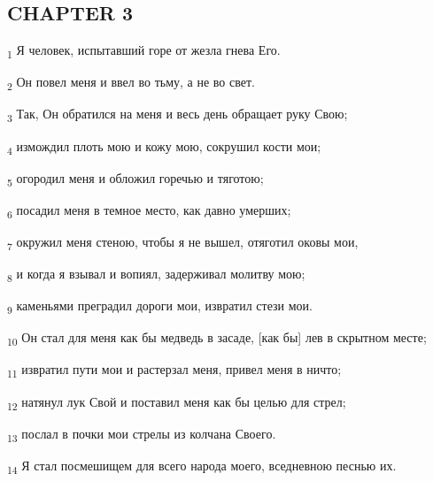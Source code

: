 \subsection{CHAPTER 3}
\begin{tcolorbox}
\textsubscript{1} Я человек, испытавший горе от жезла гнева Его.
\end{tcolorbox}
\begin{tcolorbox}
\textsubscript{2} Он повел меня и ввел во тьму, а не во свет.
\end{tcolorbox}
\begin{tcolorbox}
\textsubscript{3} Так, Он обратился на меня и весь день обращает руку Свою;
\end{tcolorbox}
\begin{tcolorbox}
\textsubscript{4} измождил плоть мою и кожу мою, сокрушил кости мои;
\end{tcolorbox}
\begin{tcolorbox}
\textsubscript{5} огородил меня и обложил горечью и тяготою;
\end{tcolorbox}
\begin{tcolorbox}
\textsubscript{6} посадил меня в темное место, как давно умерших;
\end{tcolorbox}
\begin{tcolorbox}
\textsubscript{7} окружил меня стеною, чтобы я не вышел, отяготил оковы мои,
\end{tcolorbox}
\begin{tcolorbox}
\textsubscript{8} и когда я взывал и вопиял, задерживал молитву мою;
\end{tcolorbox}
\begin{tcolorbox}
\textsubscript{9} каменьями преградил дороги мои, извратил стези мои.
\end{tcolorbox}
\begin{tcolorbox}
\textsubscript{10} Он стал для меня как бы медведь в засаде, [как бы] лев в скрытном месте;
\end{tcolorbox}
\begin{tcolorbox}
\textsubscript{11} извратил пути мои и растерзал меня, привел меня в ничто;
\end{tcolorbox}
\begin{tcolorbox}
\textsubscript{12} натянул лук Свой и поставил меня как бы целью для стрел;
\end{tcolorbox}
\begin{tcolorbox}
\textsubscript{13} послал в почки мои стрелы из колчана Своего.
\end{tcolorbox}
\begin{tcolorbox}
\textsubscript{14} Я стал посмешищем для всего народа моего, вседневною песнью их.
\end{tcolorbox}
